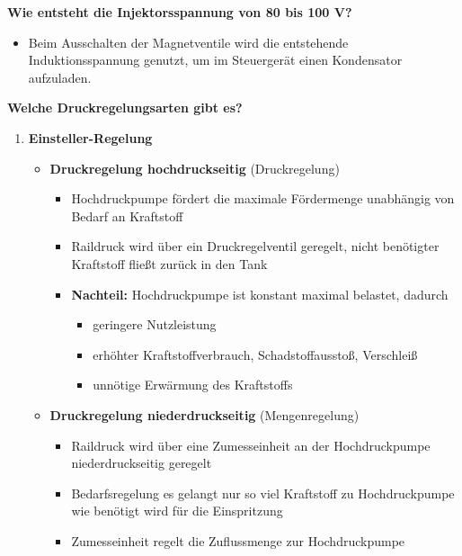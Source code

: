 \textbf{Wie entsteht die Injektorsspannung von 80 bis 100 V?}

\begin{itemize}
\item
  Beim Ausschalten der Magnetventile wird die entstehende
  Induktionsspannung genutzt, um im Steuergerät einen Kondensator
  aufzuladen.
\end{itemize}

\newpage

\textbf{Welche Druckregelungsarten gibt es?}

\begin{enumerate}
\item
  \textbf{Einsteller-Regelung}

  \begin{itemize}
  \item
    \textbf{Druckregelung hochdruckseitig} (Druckregelung)

    \begin{itemize}
    \item
      Hochdruckpumpe fördert die maximale Fördermenge unabhängig von
      Bedarf an Kraftstoff
    \item
      Raildruck wird über ein Druckregelventil geregelt, nicht
      benötigter Kraftstoff fließt zurück in den Tank
    \item
      \textbf{Nachteil:} Hochdruckpumpe ist konstant maximal belastet,
      dadurch

      \begin{itemize}
      \item
        geringere Nutzleistung
      \item
        erhöhter Kraftstoffverbrauch, Schadstoffausstoß, Verschleiß
      \item
        unnötige Erwärmung des Kraftstoffs
      \end{itemize}
    \end{itemize}
  \item
    \textbf{Druckregelung niederdruckseitig} (Mengenregelung)

    \begin{itemize}
    \item
      Raildruck wird über eine Zumesseinheit an der Hochdruckpumpe
      niederdruckseitig geregelt
    \item
      Bedarfsregelung es gelangt nur so viel Kraftstoff zu
      Hochdruckpumpe wie benötigt wird für die Einspritzung
    \item
      Zumesseinheit regelt die Zuflussmenge zur Hochdruckpumpe


\end{itemize}
\end{itemize}
\end{enumerate}
